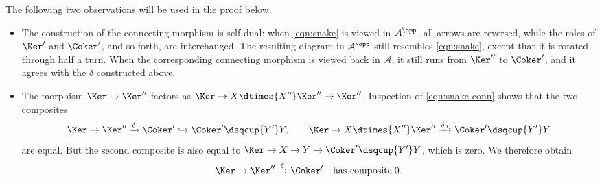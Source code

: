 The following two observations will be used in the proof below.
\begin{itemize}
	\item The construction of the connecting morphism is self-dual: when
	\eqref{eqn:snake} is viewed in $\mathcal{A}^{\opp}$, all arrows are
	reversed, while the roles of $\Ker'$ and $\Coker'$, and so forth, are
	interchanged. The resulting diagram in $\mathcal{A}^{\opp}$ still resembles
	\eqref{eqn:snake}, except that it is rotated through half a turn. When the
	corresponding connecting morphism is viewed back in $\mathcal{A}$, it still
	runs from $\Ker''$ to $\Coker'$, and it agrees with the $\delta$ constructed
	above.
	
	\item The morphism $\Ker\to\Ker''$ factors as
	$\Ker\to X\dtimes{X''}\Ker''\to\Ker''$. Inspection of
	\eqref{eqn:snake-conn} shows that the two composites
	\[ \Ker \to \Ker'' \xrightarrow{\delta} \Coker' \hookrightarrow \Coker' \dsqcup{Y'} Y, \qquad \Ker \to X \dtimes{X''} \Ker'' \xrightarrow{\delta_0} \Coker' \dsqcup{Y'} Y \]
		are equal. But the second composite is also equal to
	$\Ker\to X\to Y\to\Coker'\dsqcup{Y'}Y$, which is zero. We therefore obtain
	\begin{equation}\label{eqn:snake-conn-complex}
		\Ker \to \Ker'' \xrightarrow{\delta} \Coker' \quad \text{has composite}\; 0.
	\end{equation}
\end{itemize}


